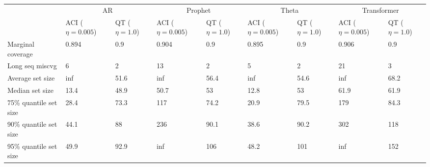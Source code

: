 \begin{tabular}{lllllllll}
\toprule
& \multicolumn{2}{c}{AR}& \multicolumn{2}{c}{Prophet}& \multicolumn{2}{c}{Theta}& \multicolumn{2}{c}{Transformer} \\
& ACI ($\eta=0.005$) & QT ($\eta=1.0$) & ACI ($\eta=0.005$) & QT ($\eta=1.0$) & ACI ($\eta=0.005$) & QT ($\eta=1.0$) & ACI ($\eta=0.005$) & QT ($\eta=1.0$) \\
\midrule
Marginal coverage & 0.894 & 0.9 & 0.904 & 0.9 & 0.895 & 0.9 & 0.906 & 0.9 \\
Long seq miscvg & 6 & 2 & 13 & 2 & 5 & 2 & 21 & 3 \\
Average set size & inf & 51.6 & inf & 56.4 & inf & 54.6 & inf & 68.2 \\
Median set size & 13.4 & 48.9 & 50.7 & 53 & 12.8 & 53 & 61.9 & 61.9 \\
75\% quantile set size & 28.4 & 73.3 & 117 & 74.2 & 20.9 & 79.5 & 179 & 84.3 \\
90\% quantile set size & 44.1 & 88 & 236 & 90.1 & 38.6 & 90.2 & 302 & 118 \\
95\% quantile set size & 49.9 & 92.9 & inf & 106 & 48.2 & 101 & inf & 152 \\
\bottomrule
\end{tabular}
